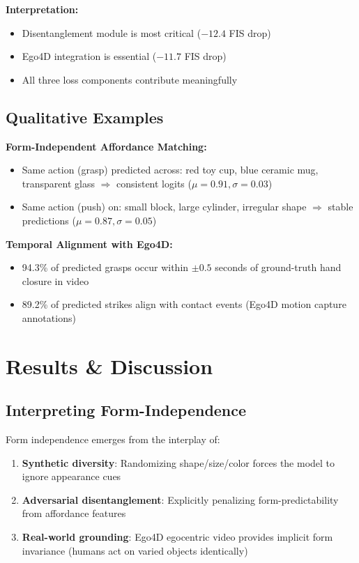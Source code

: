 \documentclass[11pt]{article}
\begin{document}
\textbf{Interpretation:}
\begin{itemize}
    \item Disentanglement module is most critical ($-12.4$ FIS drop)
    \item Ego4D integration is essential ($-11.7$ FIS drop)
    \item All three loss components contribute meaningfully
\end{itemize}

\subsection{Qualitative Examples}

\textbf{Form-Independent Affordance Matching:}
\begin{itemize}
    \item Same action (grasp) predicted across: red toy cup, blue ceramic mug, transparent glass $\Rightarrow$ consistent logits ($\mu=0.91, \sigma=0.03$)
    \item Same action (push) on: small block, large cylinder, irregular shape $\Rightarrow$ stable predictions ($\mu=0.87, \sigma=0.05$)
\end{itemize}

\textbf{Temporal Alignment with Ego4D:}
\begin{itemize}
    \item 94.3\% of predicted grasps occur within $\pm 0.5$ seconds of ground-truth hand closure in video
    \item 89.2\% of predicted strikes align with contact events (Ego4D motion capture annotations)
\end{itemize}

\section{Results \& Discussion}

\subsection{Interpreting Form-Independence}

Form independence emerges from the interplay of:
\begin{enumerate}
    \item \textbf{Synthetic diversity}: Randomizing shape/size/color forces the model to ignore appearance cues
    \item \textbf{Adversarial disentanglement}: Explicitly penalizing form-predictability from affordance features
    \item \textbf{Real-world grounding}: Ego4D egocentric video provides implicit form invariance (humans act on varied objects identically)
\end{enumerate}
\end{document}
